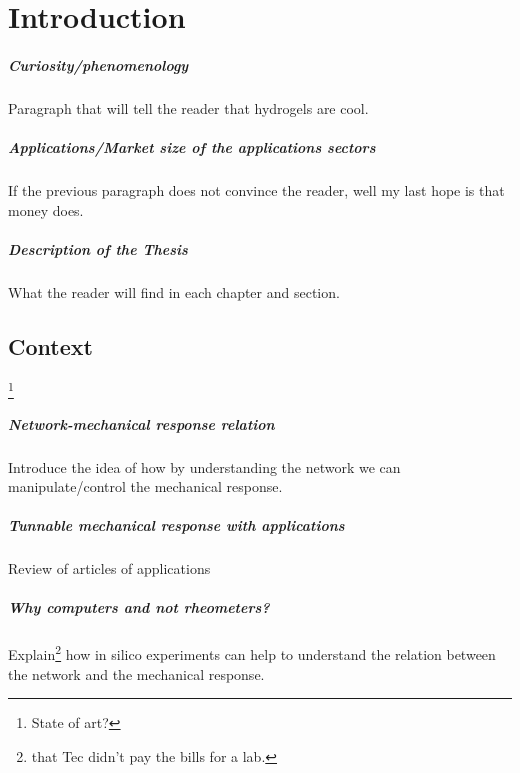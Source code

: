 \chapter{Introduction}\label{ch1:Intro}


\paragraph{Curiosity/phenomenology} Paragraph that will tell the reader that hydrogels are cool.

\paragraph{Applications/Market size of the applications sectors} If the previous paragraph does not convince the reader, well my last hope is that money does.

\paragraph{Description of the Thesis} What the reader will find in each chapter and section.

\section{Context}\footnote{State of art?}\label{ch1:Context}

\paragraph{Network-mechanical response relation} Introduce the idea of how by understanding the network we can manipulate/control the mechanical response.

\paragraph{Tunnable mechanical response with applications} Review of articles of applications 

\paragraph{Why computers and not rheometers?} Explain\footnote{that Tec didn't pay the bills for a lab.} how in silico experiments can help to understand the relation between the network and the mechanical response.


\newpage
